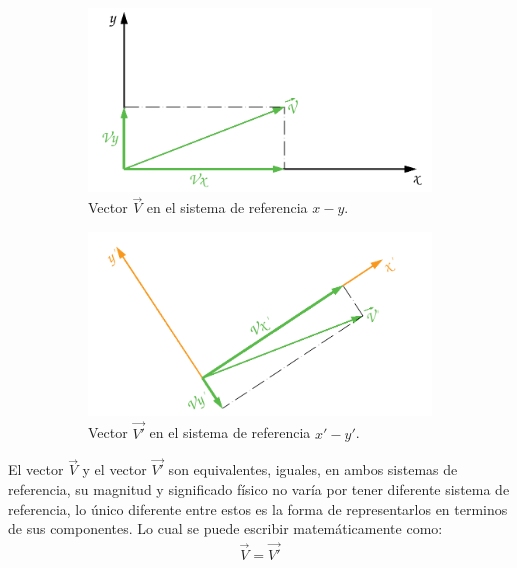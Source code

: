\documentclass[12pt,letterpaper]{article}
\begin{document}
\begin{figure}[h]
	\centering
	\begin{subfigure}[l]{0.450\textwidth}
		\includegraphics[width=\textwidth]{img/Vector1Componentes.pdf}
		\caption{Vector $\overset{\rightarrow}{V}$ en el sistema de referencia $x-y$.}
		\label{vector1comp}
	\end{subfigure}
	\hspace{.5 cm}
	\begin{subfigure}[r]{0.450\textwidth}
		\includegraphics[width=\textwidth]{img/Vector2Componentes.pdf}
		\caption{Vector $\overset{\rightarrow}{V'}$ en el sistema de referencia $x'-y'$.}
		\label{vector2comp}
	\end{subfigure}	
	\caption{}
\end{figure}
%
%
El vector $\overset{\rightarrow}{V}$ y el vector $\overset{\rightarrow}{V'}$ son equivalentes, iguales, en ambos sistemas de referencia, su magnitud y significado físico no varía por tener diferente sistema de referencia, lo único diferente entre estos es la forma de representarlos en terminos de sus componentes. Lo cual se puede escribir matemáticamente como:
%
\begin{align}
	\overset{\rightarrow}{V} = \overset{\rightarrow}{V'}
	\label{uno}
\end{align}
%
\end{document}
